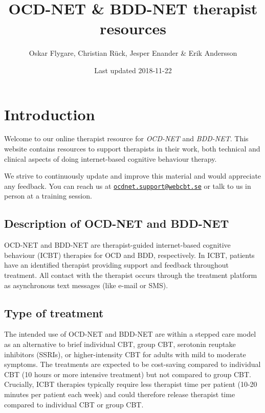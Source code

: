 \documentclass[]{book}
\title{OCD-NET \& BDD-NET therapist resources}
\author{Oskar Flygare, Christian Rück, Jesper Enander \& Erik Andersson}
\date{Last updated 2018-11-22}
\theoremstyle{definition}
\theoremstyle{definition}
\theoremstyle{definition}
\theoremstyle{remark}
\begin{document}
\maketitle

{
\setcounter{tocdepth}{1}
\tableofcontents
}
\hypertarget{introduction}{%
\chapter{Introduction}\label{introduction}}

Welcome to our online therapist resource for \emph{OCD-NET} and
\emph{BDD-NET}. This website contains resources to support therapists in
their work, both technical and clinical aspects of doing internet-based
cognitive behaviour therapy.

We strive to continuously update and improve this material and would
appreciate any feedback. You can reach us at
\href{mailto:ocdnet.support@webcbt.se}{\nolinkurl{ocdnet.support@webcbt.se}}
or talk to us in person at a training session.

\hypertarget{description-of-ocd-net-and-bdd-net}{%
\section{Description of OCD-NET and
BDD-NET}\label{description-of-ocd-net-and-bdd-net}}

OCD-NET and BDD-NET are therapist-guided internet-based cognitive
behaviour (ICBT) therapies for OCD and BDD, respectively. In ICBT,
patients have an identified therapist providing support and feedback
throughout treatment. All contact with the therapist occurs through the
treatment platform as asynchronous text messages (like e-mail or SMS).

\hypertarget{type-of-treatment}{%
\section{Type of treatment}\label{type-of-treatment}}

The intended use of OCD-NET and BDD-NET are within a stepped care model
as an alternative to brief individual CBT, group CBT, serotonin reuptake
inhibitors (SSRIs), or higher-intensity CBT for adults with mild to
moderate symptoms. The treatments are expected to be cost-saving
compared to individual CBT (10 hours or more intensive treatment) but
not compared to group CBT. Crucially, ICBT therapies typically require
less therapist time per patient (10-20 minutes per patient each week)
and could therefore release therapist time compared to individual CBT or
group CBT.
\end{document}
